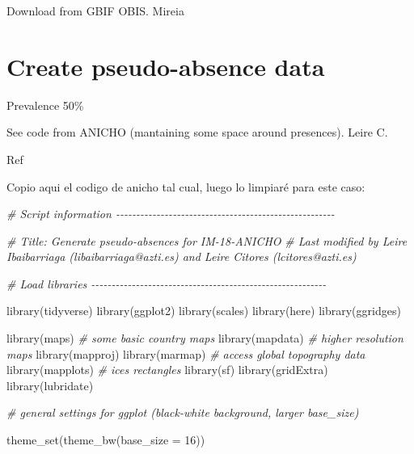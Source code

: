 \documentclass[
]{book}
\newenvironment{Shaded}{\begin{snugshade}}{\end{snugshade}}
\newcommand{\AttributeTok}[1]{\textcolor[rgb]{0.77,0.63,0.00}{#1}}
\newcommand{\CommentTok}[1]{\textcolor[rgb]{0.56,0.35,0.01}{\textit{#1}}}
\newcommand{\DecValTok}[1]{\textcolor[rgb]{0.00,0.00,0.81}{#1}}
\newcommand{\FunctionTok}[1]{\textcolor[rgb]{0.00,0.00,0.00}{#1}}
\newcommand{\NormalTok}[1]{#1}
\begin{document}
Download from GBIF OBIS. Mireia

\hypertarget{create-pseudo-absence-data}{%
\section{Create pseudo-absence data}\label{create-pseudo-absence-data}}

Prevalence 50\%

See code from ANICHO (mantaining some space around presences). Leire C.

Ref \citep{barbetmassin_etal_2012}

Copio aqui el codigo de anicho tal cual, luego lo limpiaré para este caso:

\begin{Shaded}
\begin{Highlighting}[]
\CommentTok{\# Script information {-}{-}{-}{-}{-}{-}{-}{-}{-}{-}{-}{-}{-}{-}{-}{-}{-}{-}{-}{-}{-}{-}{-}{-}{-}{-}{-}{-}{-}{-}{-}{-}{-}{-}{-}{-}{-}{-}{-}{-}{-}{-}{-}{-}{-}{-}{-}{-}{-}{-}{-}{-}{-}{-}}

\CommentTok{\# Title: Generate pseudo{-}absences for IM{-}18{-}ANICHO}
\CommentTok{\# Last modified by Leire Ibaibarriaga (libaibarriaga@azti.es) and Leire Citores (lcitores@azti.es)}

\CommentTok{\# Load libraries {-}{-}{-}{-}{-}{-}{-}{-}{-}{-}{-}{-}{-}{-}{-}{-}{-}{-}{-}{-}{-}{-}{-}{-}{-}{-}{-}{-}{-}{-}{-}{-}{-}{-}{-}{-}{-}{-}{-}{-}{-}{-}{-}{-}{-}{-}{-}{-}{-}{-}{-}{-}{-}{-}{-}{-}{-}{-}}

\FunctionTok{library}\NormalTok{(tidyverse)}
\FunctionTok{library}\NormalTok{(ggplot2)}
\FunctionTok{library}\NormalTok{(scales)}
\FunctionTok{library}\NormalTok{(here)}
\FunctionTok{library}\NormalTok{(ggridges)}

\FunctionTok{library}\NormalTok{(maps)        }\CommentTok{\# some basic country maps}
\FunctionTok{library}\NormalTok{(mapdata)     }\CommentTok{\# higher resolution maps}
\FunctionTok{library}\NormalTok{(mapproj)}
\FunctionTok{library}\NormalTok{(marmap)      }\CommentTok{\# access global topography data}
\FunctionTok{library}\NormalTok{(mapplots)    }\CommentTok{\# ices rectangles}
\FunctionTok{library}\NormalTok{(sf)}
\FunctionTok{library}\NormalTok{(gridExtra)}
\FunctionTok{library}\NormalTok{(lubridate)}

\CommentTok{\# general settings for ggplot (black{-}white background, larger base\_size)}

\FunctionTok{theme\_set}\NormalTok{(}\FunctionTok{theme\_bw}\NormalTok{(}\AttributeTok{base\_size =} \DecValTok{16}\NormalTok{))}


\end{Highlighting}
\end{Shaded}
\end{document}
